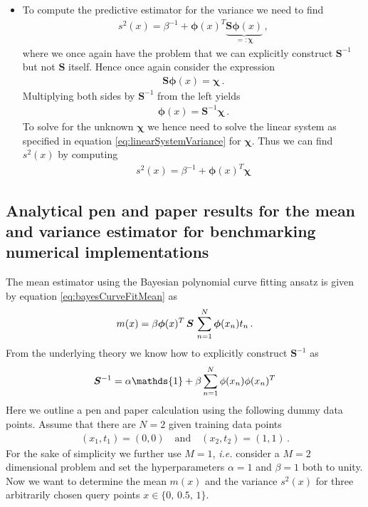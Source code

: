 \documentclass[11pt, DINA4, fleqn]{amsart}
\begin{document}
\begin{itemize}
	\item To compute the predictive estimator for the variance we need to find
	\begin{align}
	s^2(x) = \beta^{-1} + \bm{\phi}(x)^T\underbrace{\bm{S}\bm{\phi}(x)}_{=:\bm{\chi}} \, ,
	\end{align}
	where we once again have the problem that we can explicitly construct $\bm{S}^{-1}$ but not $\bm{S}$ itself. Hence once again consider the expression
	\begin{align}
	\bm{S}\bm{\phi}(x) = \bm{\chi} \, .
	\end{align}
	Multiplying both sides by $\bm{S}^{-1}$ from the left yields
	\begin{align}
	\bm{\phi}(x) = \bm{S}^{-1}\bm{\chi} \, .
	\label{eq:linearSystemVariance}
	\end{align}
	To solve for the unknown $\bm{\chi}$ we hence need to solve the linear system as specified in equation \eqref{eq:linearSystemVariance} for $\bm{\chi}$. Thus we can find $s^2(x)$ by computing
	\begin{align}
	s^2(x) = \beta^{-1} + \bm{\phi}(x)^T\bm{\chi}
	\end{align}	
\end{itemize}

\subsection{Analytical pen and paper results for the mean and variance estimator for benchmarking numerical implementations}
The mean estimator using the Bayesian polynomial curve fitting ansatz is given by equation \eqref{eq:bayesCurveFitMean} as
\begin{align}
m(x) = \beta \bm{\phi}(x)^T \, \bm{S} \, \sum\displaylimits_{n=1}^{N}\bm{\phi}(x_n)t_n \, .
\end{align}
From the underlying theory we know how to explicitly construct $\bm{S}^{-1}$ as
\begin{align}
\bm{S}^{-1} = \alpha\mathds{1} + \beta \sum\displaylimits_{n=1}^{N} \phi(x_n)\phi(x_n)^T
\label{eq:Sinv}
\end{align}
Here we outline a pen and paper calculation using the following dummy data points. Assume that there are $N=2$ given training data points
\begin{align}
(x_1, t_1) = (0, 0) \quad \text{and} \quad (x_2, t_2) = (1, 1)\, .
\end{align}
For the sake of simplicity we further use $M=1$, \textit{i.e.} consider a $M=2$ dimensional problem and set the hyperparameters $\alpha = 1$ and $\beta =1$ both to unity.
Now we want to determine the mean $m(x)$ and the variance $s^2(x)$ for three arbitrarily chosen query points $x\in\{0,\, 0.5,\, 1\}$.
\end{document}
